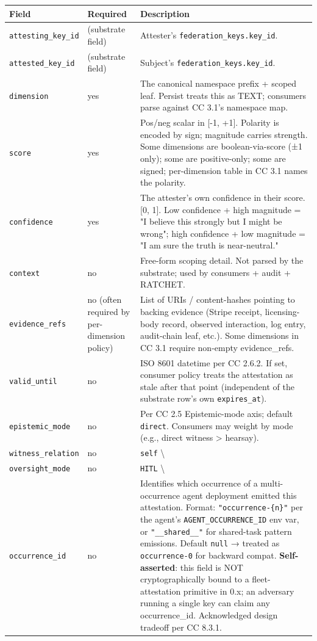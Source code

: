 \documentclass[11pt]{article}
\begin{document}
{\footnotesize
\begin{longtable}{|p{5.33cm}|p{5.33cm}|p{5.33cm}|}\hline
\textbf{Field} & \textbf{Required} & \textbf{Description} \\ \hline\endhead
\texttt{attesting\_key\_id} & (substrate field) & Attester's \texttt{federation\_keys.key\_id}. \\ \hline
\texttt{attested\_key\_id} & (substrate field) & Subject's \texttt{federation\_keys.key\_id}. \\ \hline
\texttt{dimension} & yes & The canonical namespace prefix + scoped leaf. Persist treats this as TEXT; consumers parse against CC 3.1's namespace map. \\ \hline
\texttt{score} & yes & Pos/neg scalar in [-1, +1]. Polarity is encoded by sign; magnitude carries strength. Some dimensions are boolean-via-score (±1 only); some are positive-only; some are signed; per-dimension table in CC 3.1 names the polarity. \\ \hline
\texttt{confidence} & yes & The attester's own confidence in their score. [0, 1]. Low confidence + high magnitude = "I believe this strongly but I might be wrong"; high confidence + low magnitude = "I am sure the truth is near-neutral." \\ \hline
\texttt{context} & no & Free-form scoping detail. Not parsed by the substrate; used by consumers + audit + RATCHET. \\ \hline
\texttt{evidence\_refs} & no (often required by per-dimension policy) & List of URIs / content-hashes pointing to backing evidence (Stripe receipt, licensing-body record, observed interaction, log entry, audit-chain leaf, etc.). Some dimensions in CC 3.1 require non-empty evidence\_refs. \\ \hline
\texttt{valid\_until} & no & ISO 8601 datetime per CC 2.6.2. If set, consumer policy treats the attestation as stale after that point (independent of the substrate row's own \texttt{expires\_at}). \\ \hline
\texttt{epistemic\_mode} & no & Per CC 2.5 Epistemic-mode axis; default \texttt{direct}. Consumers may weight by mode (e.g., direct witness > hearsay). \\ \hline
\texttt{witness\_relation} & no & \texttt{self} \textbackslash{} \\ \hline
\texttt{oversight\_mode} & no & \texttt{HITL} \textbackslash{} \\ \hline
\texttt{occurrence\_id} & no & Identifies which occurrence of a multi-occurrence agent deployment emitted this attestation. Format: \texttt{"occurrence-\{n\}"} per the agent's \texttt{AGENT\_OCCURRENCE\_ID} env var, or \texttt{"\_\_shared\_\_"} for shared-task pattern emissions. Default \texttt{null} → treated as \texttt{occurrence-0} for backward compat. \textbf{Self-asserted}: this field is NOT cryptographically bound to a fleet-attestation primitive in 0.x; an adversary running a single key can claim any occurrence\_id. Acknowledged design tradeoff per CC 8.3.1. \\ \hline

\end{longtable}}
\end{document}
